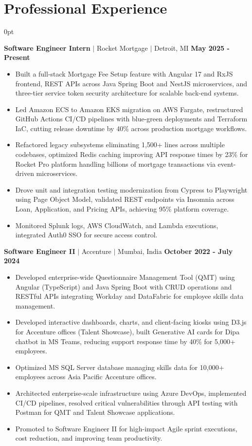 \documentclass[letterpaper,10pt]{article}
\newlength{\contentindent}
\newcommand{\sectioncontent}[1]{%
  \begin{adjustwidth}{\contentindent}{0pt}%
  #1%
  \end{adjustwidth}%
}
\begin{document}
\section{Professional Experience}
\sectioncontent{
\textbf{Software Engineer Intern} $|$ Rocket Mortgage $|$ Detroit, MI \hfill \textbf{May 2025 - Present}
\begin{itemize}
    \item Built a full-stack Mortgage Fee Setup feature with Angular 17 and RxJS frontend, REST APIs across Java Spring Boot and NestJS microservices, and three-tier service token security architecture for scalable back-end systems.
    \item Led Amazon ECS to Amazon EKS migration on AWS Fargate, restructured GitHub Actions CI/CD pipelines with blue-green deployments and Terraform IaC, cutting release downtime by 40\% across production mortgage workflows.
    \item Refactored legacy subsystems eliminating 1,500+ lines across multiple codebases, optimized Redis caching improving API response times by 23\% for Rocket Pro platform handling billions of mortgage transactions via event-driven microservices.
    \item Drove unit and integration testing modernization from Cypress to Playwright using Page Object Model, validated REST endpoints via Insomnia across Loan, Application, and Pricing APIs, achieving 95\% platform coverage.
    \item Monitored Splunk logs, AWS CloudWatch, and Lambda executions, integrated Auth0 SSO for secure access control.
\end{itemize}

\textbf{Software Engineer II} $|$ Accenture $|$ Mumbai, India \hfill \textbf{October 2022 - July 2024}
\begin{itemize}
    \item Developed enterprise-wide Questionnaire Management Tool (QMT) using Angular (TypeScript) and Java Spring Boot with CRUD operations and RESTful APIs integrating Workday and DataFabric for employee skills data management.
    \item Developed interactive dashboards, charts, and client-facing kiosks using D3.js for Accenture offices (Talent Showcase), built Generative AI cards for Dipa chatbot in MS Teams, reducing support response time by 40\% for 5,000+ employees.
    \item Optimized MS SQL Server database managing skills data for 10,000+ employees across Asia Pacific Accenture offices.
    \item Architected enterprise-scale infrastructure using Azure DevOps, implemented CI/CD pipelines, resolved critical vulnerabilities through API testing with Postman for QMT and Talent Showcase applications.
    \item Promoted to Software Engineer II for high-impact Agile sprint executions, cost reduction, and improving team productivity.
\end{itemize}
}
\end{document}
